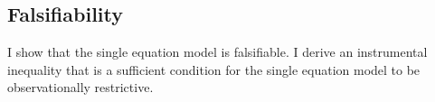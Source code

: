 \documentclass[12pt,a4paper,twoside]{article}
\newcommand\independent{\protect\mathpalette{\protect\independenT}{\perp}}
\def\independenT#1#2{\mathrel{\rlap{$#1#2$}\mkern2mu{#1#2}}}
\numberwithin{equation}{section}
\begin{document}
\subsection{Falsifiability}
I show that the single equation model is falsifiable. I derive an instrumental inequality \citep{p95b} that is a sufficient condition for the single equation model to be observationally restrictive. 
\end{document}
